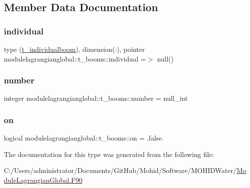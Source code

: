 \subsection{Member Data Documentation}
\mbox{\label{structmodulelagrangianglobal_1_1t__booms_aaf33e1a50497253ee70c9a44f353d01c}} 
\subsubsection{\texorpdfstring{individual}{individual}}
{\footnotesize\ttfamily type (\mbox{\hyperlink{structmodulelagrangianglobal_1_1t__individualboom}{t\+\_\+individualboom}}), dimension(\+:), pointer modulelagrangianglobal\+::t\+\_\+booms\+::individual =$>$ null()\hspace{0.3cm}{\ttfamily [private]}}

\mbox{\label{structmodulelagrangianglobal_1_1t__booms_addce761c48c78b31fc79d389e283a6ef}} 
\subsubsection{\texorpdfstring{number}{number}}
{\footnotesize\ttfamily integer modulelagrangianglobal\+::t\+\_\+booms\+::number = null\+\_\+int\hspace{0.3cm}{\ttfamily [private]}}

\mbox{\label{structmodulelagrangianglobal_1_1t__booms_aa1c4861c5d174856cd2bea86ecf52bce}} 
\subsubsection{\texorpdfstring{on}{on}}
{\footnotesize\ttfamily logical modulelagrangianglobal\+::t\+\_\+booms\+::on = .false.\hspace{0.3cm}{\ttfamily [private]}}



The documentation for this type was generated from the following file\+:\begin{DoxyCompactItemize}
\item 
C\+:/\+Users/administrator/\+Documents/\+Git\+Hub/\+Mohid/\+Software/\+M\+O\+H\+I\+D\+Water/\mbox{\hyperlink{_module_lagrangian_global_8_f90}{Module\+Lagrangian\+Global.\+F90}}\end{DoxyCompactItemize}
